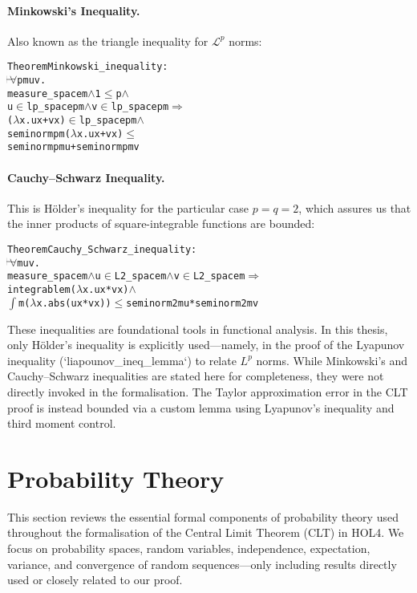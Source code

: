\paragraph{Minkowski’s Inequality.}
Also known as the triangle inequality for $\mathcal{L}^p$ norms:
\begin{hol}
\begin{alltt}
Theorem Minkowski\_inequality :
\(\!\!\!{\turn}\!\!\!\!\) \(\forall\)p m u v.
measure\_space m \(\land\) 1 \(\le\) p \(\land\)
u \(\in\) lp\_space p m \(\land\) v \(\in\) lp\_space p m \(\Rightarrow\)
(\(\lambda\)x. u x + v x) \(\in\) lp\_space p m \(\land\)
seminorm p m (\(\lambda\)x. u x + v x) \(\le\)
seminorm p m u + seminorm p m v
\end{alltt}
\end{hol}

\paragraph{Cauchy–Schwarz Inequality.}
This is Hölder's inequality for the particular case $p = q = 2$, which assures us that the inner products of square-integrable functions are bounded:
\begin{hol}
\begin{alltt}
Theorem Cauchy\_Schwarz\_inequality :
\(\!\!\!{\turn}\!\!\!\!\) \(\forall\)m u v.
measure\_space m \(\land\) u \(\in\) L2\_space m \(\land\) v \(\in\) L2\_space m \(\Rightarrow\)
integrable m (\(\lambda\)x. u x * v x) \(\land\)
\(\int\) m (\(\lambda\)x. abs (u x * v x)) \(\le\) seminorm 2 m u * seminorm 2 m v
\end{alltt}
\end{hol}

These inequalities are foundational tools in functional analysis. In this thesis, only Hölder’s inequality is explicitly used—namely, in the proof of the Lyapunov inequality (`liapounov\_ineq\_lemma`) to relate $L^p$ norms. While Minkowski’s and Cauchy–Schwarz inequalities are stated here for completeness, they were not directly invoked in the formalisation. The Taylor approximation error in the CLT proof is instead bounded via a custom lemma using Lyapunov’s inequality and third moment control.

\section{Probability Theory}

This section reviews the essential formal components of probability theory used throughout the formalisation of the Central Limit Theorem (CLT) in HOL4. We focus on probability spaces, random variables, independence, expectation, variance, and convergence of random sequences—only including results directly used or closely related to our proof.

